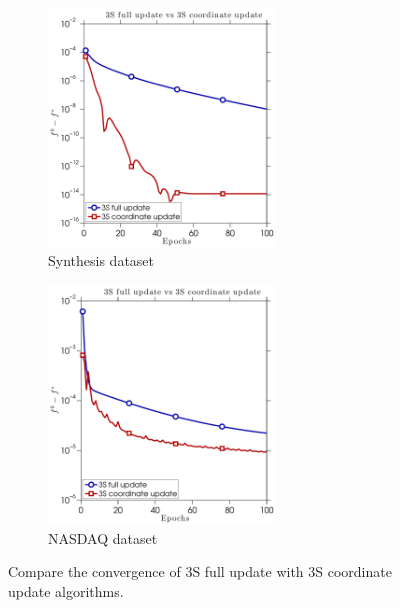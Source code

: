 \begin{figure} \centering
    \begin{subfigure}[b]{0.45\linewidth}
        \includegraphics[width=60mm]{./figs/synth_data_f_err_cropped}
        \caption{Synthesis dataset}
        \label{fig:a}
    \end{subfigure} %
    \quad
    \begin{subfigure}[b]{0.45\linewidth}
        \includegraphics[width=60mm]{./figs/real_data_f_err_cropped}
        \caption{NASDAQ dataset}
        \label{fig:a}
    \end{subfigure} %
    \caption{Compare the convergence of 3S full update with 3S coordinate update algorithms.}
    \label{fig:3s_results}
\end{figure}


